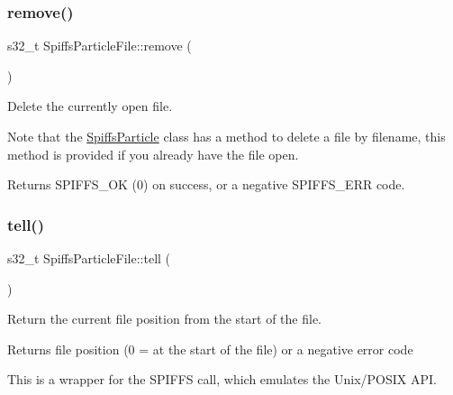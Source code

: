 \subsubsection{\texorpdfstring{remove()}{remove()}}
{\footnotesize\ttfamily s32\+\_\+t Spiffs\+Particle\+File\+::remove (\begin{DoxyParamCaption}{ }\end{DoxyParamCaption})\hspace{0.3cm}{\ttfamily [inline]}}



Delete the currently open file. 

Note that the \mbox{\hyperlink{class_spiffs_particle}{Spiffs\+Particle}} class has a method to delete a file by filename, this method is provided if you already have the file open.

\begin{DoxyReturn}{Returns}
S\+P\+I\+F\+F\+S\+\_\+\+OK (0) on success, or a negative S\+P\+I\+F\+F\+S\+\_\+\+E\+RR code. 
\end{DoxyReturn}
\mbox{\label{class_spiffs_particle_file_ac1cb4c1027e6e635aff6864efedd0faa}} 
\subsubsection{\texorpdfstring{tell()}{tell()}}
{\footnotesize\ttfamily s32\+\_\+t Spiffs\+Particle\+File\+::tell (\begin{DoxyParamCaption}{ }\end{DoxyParamCaption})\hspace{0.3cm}{\ttfamily [inline]}}



Return the current file position from the start of the file. 

\begin{DoxyReturn}{Returns}
file position (0 = at the start of the file) or a negative error code
\end{DoxyReturn}
This is a wrapper for the S\+P\+I\+F\+FS call, which emulates the Unix/\+P\+O\+S\+IX A\+PI. \mbox{\label{class_spiffs_particle_file_ae6d57777d56e7594d811c0e7e0e74eab}} 
